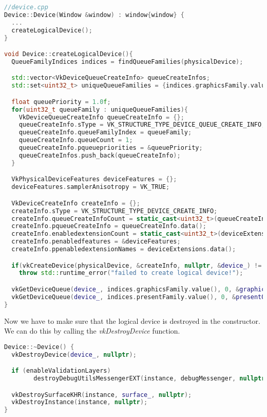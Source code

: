 \documentclass[12pt]{report} \usepackage{preamble}
\begin{document}
\begin{lstlisting}[language=C++]
//device.cpp
Device::Device(Window &window) : window{window} {
  ...
  createLogicalDevice();
}

void Device::createLogicalDevice(){
  QueueFamilyIndices indices = findQueueFamilies(physicalDevice);

  std::vector<VkDeviceQueueCreateInfo> queueCreateInfos;
  std::set<uint32_t> uniqueQueueFamilies = {indices.graphicsFamily.value(), indices.presentFamily.value()};

  float queuePriority = 1.0f;
  for(uint32_t queueFamily : uniqueQueueFamilies){
    VkDeviceQueueCreateInfo queueCreateInfo = {};
    queueCreateInfo.sType = VK_STRUCTURE_TYPE_DEVICE_QUEUE_CREATE_INFO;
    queueCreateInfo.queueFamilyIndex = queueFamily;
    queueCreateInfo.queueCount = 1;
    queueCreateInfo.pqueuepriorities = &queuePriority;
    queueCreateInfos.push_back(queueCreateInfo);
  }

  VkPhysicalDeviceFeatures deviceFeatures = {};
  deviceFeatures.samplerAnisotropy = VK_TRUE;

  VkDeviceCreateInfo createInfo = {};
  createInfo.sType = VK_STRUCTURE_TYPE_DEVICE_CREATE_INFO;
  createInfo.queueCreateInfoCount = static_cast<uint32_t>(queueCreateInfo.size());
  createInfo.pqueueCreateInfo = queueCreateInfo.data();
  createInfo.enabledextensionCount = static_cast<uint32_t>(deviceExtensions.size());
  createInfo.penabledfeatures = &deviceFeatures;
  createInfo.ppenabledextensionNames = deviceExtensions.data();

  if(vkCreateDevice(physicalDevice, &createInfo, nullptr, &device_) != VK_SUCCESS)
    throw std::runtime_error("failed to create logical device!");

  vkGetDeviceQueue(device_, indices.graphicsFamily.value(), 0, &graphicsQueue_);
  vkGetDeviceQueue(device_, indices.presentFamily.value(), 0, &presentQueue_);
}
\end{lstlisting}

Now we have to make sure that the logical device is destroyed in the constructor.
We can do this by calling the \textit{vkDestroyDevice} function.

\begin{lstlisting}[language=C++]
Device::~Device() {
  vkDestroyDevice(device_, nullptr);

  if (enableValidationLayers)
		destroyDebugUtilsMessengerEXT(instance, debugMessenger, nullptr);

  vkDestroySurfaceKHR(instance, surface_, nullptr);
  vkDestroyInstance(instance, nullptr);
}
\end{lstlisting}
\end{document}
